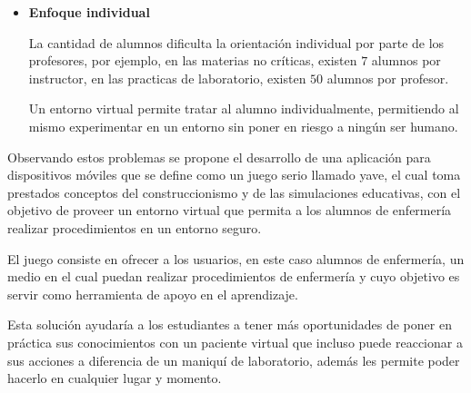 \begin{itemize}
\item \textbf{Enfoque individual}
    
    La cantidad de alumnos dificulta la orientación individual por parte de los
    profesores, por ejemplo, en las materias no críticas, existen $7$ alumnos
    por instructor, en las practicas de laboratorio, existen $50$ alumnos por
    profesor.

    Un entorno virtual permite tratar al alumno individualmente, permitiendo al
    mismo experimentar en un entorno sin poner en riesgo a ningún ser humano.

\end{itemize}







Observando estos problemas se propone el desarrollo de una aplicación para
dispositivos móviles que se define como un juego serio llamado \Gls{yave}, el
cual toma prestados conceptos del construccionismo y de las simulaciones
educativas, con el objetivo de proveer un entorno virtual que permita a los
alumnos de enfermería realizar procedimientos en un entorno seguro.

El juego consiste en ofrecer a los usuarios, en este caso alumnos de enfermería,
un medio en el cual puedan realizar procedimientos de enfermería y cuyo objetivo
es servir como herramienta de apoyo en el aprendizaje.

Esta solución ayudaría a los estudiantes a tener más oportunidades de poner en
práctica sus conocimientos con un paciente virtual que incluso puede reaccionar
a sus acciones a diferencia de un maniquí de laboratorio, además les permite
poder hacerlo en cualquier lugar y momento.


